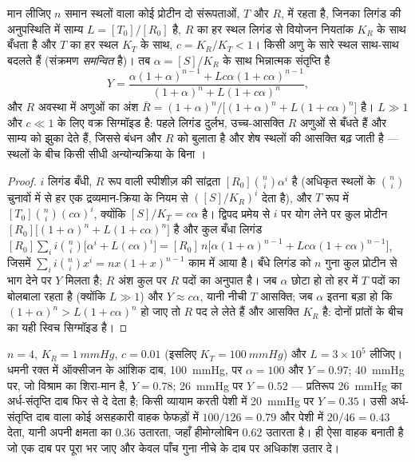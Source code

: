 \begin{theorem}[मोनो--वाइमन--शांज़ प्रतिरूप]\label{thm:b3:structural-biology:mwc}
मान लीजिए $n$ समान स्थलों वाला कोई प्रोटीन दो संरूपताओं,
$T$ और $R$, में रहता है, जिनका लिगंड की अनुपस्थिति में साम्य
$L = [T_{0}]/[R_{0}]$ है, $R$ का हर स्थल लिगंड से वियोजन नियतांक
$K_{R}$ के साथ बँधता है और $T$ का हर स्थल $K_{T}$ के साथ,
$c = K_{R}/K_{T} < 1$। किसी अणु के सारे स्थल साथ-साथ बदलते हैं
(संक्रमण \emph{समन्वित} है)। तब $\alpha = [S]/K_{R}$ के साथ
भिन्नात्मक संतृप्ति है
\[
Y = \frac{\alpha(1+\alpha)^{n-1} + Lc\alpha(1+c\alpha)^{n-1}}
{(1+\alpha)^{n} + L(1+c\alpha)^{n}},
\]
और $R$ अवस्था में अणुओं का अंश $\bar R =
(1+\alpha)^{n}/\bigl[(1+\alpha)^{n} + L(1+c\alpha)^{n}\bigr]$ है। $L
\gg 1$ और $c \ll 1$ के लिए वक्र सिग्मॉइड है: पहले लिगंड दुर्लभ,
उच्च-आसक्ति $R$ अणुओं से बँधते हैं और साम्य को झुका देते हैं, जिससे
बंधन और $R$ को बुलाता है और शेष स्थलों की आसक्ति बढ़ जाती है --- स्थलों
के बीच किसी सीधी अन्योन्यक्रिया के बिना ।
\end{theorem}
\begin{proof}
$i$ लिगंड बँधी, $R$ रूप वाली स्पीशीज़ की सांद्रता
$[R_{0}]\binom{n}{i}\alpha^{i}$ है (अधिकृत स्थलों के $\binom{n}{i}$
चुनावों में से हर एक द्रव्यमान-क्रिया के नियम से $([S]/K_{R})^{i}$
देता है), और $T$ रूप में $[T_{0}]\binom{n}{i}(c\alpha)^{i}$, क्योंकि
$[S]/K_{T} = c\alpha$ है। द्विपद प्रमेय से $i$ पर योग लेने पर कुल
प्रोटीन $[R_{0}]\bigl[(1+\alpha)^{n} + L(1+c\alpha)^{n}\bigr]$ है
और कुल बँधा लिगंड $[R_{0}]\sum_{i} i\binom{n}{i}\bigl[
\alpha^{i} + L(c\alpha)^{i}\bigr] = [R_{0}]\,n\bigl[\alpha(1+\alpha)^{n-1}
+ Lc\alpha(1+c\alpha)^{n-1}\bigr]$, जिसमें $\sum_{i} i\binom{n}{i}x^{i} =
nx(1+x)^{n-1}$ काम में आया है। बँधे लिगंड को $n$ गुना कुल प्रोटीन से
भाग देने पर $Y$ मिलता है; $R$ अंश कुल पर $R$ पदों का अनुपात है। जब
$\alpha$ छोटा हो तो हर में $T$ पदों का बोलबाला रहता है (क्योंकि $L \gg 1$)
और $Y \approx c\alpha$, यानी नीची $T$ आसक्ति; जब $\alpha$ इतना बड़ा
हो कि $(1+\alpha)^{n} > L(1+c\alpha)^{n}$ हो जाए तो $R$ पद ले लेते हैं
और आसक्ति $K_{R}$ है: दोनों प्रांतों के बीच का यही स्विच सिग्मॉइड है।
\end{proof}

\begin{example}[संख्याओं में हीमोग्लोबिन]\label{ex:b3:structural-biology:hb-numbers}
$n = 4$, $K_{R} = \qty{1}{mmHg}$, $c = 0.01$ (इसलिए $K_{T} =
\qty{100}{mmHg}$) और $L = 3\times 10^{5}$ लीजिए। धमनी रक्त में
ऑक्सीजन के आंशिक दाब, \qty{100}{mmHg}, पर $\alpha = 100$ और $Y =
0.97$; \qty{40}{mmHg} पर, जो विश्राम का शिरा-मान है, $Y = 0.78$;
\qty{26}{mmHg} पर $Y = 0.52$ --- प्रतिरूप \qty{26}{mmHg} का
अर्ध-संतृप्ति दाब फिर से दे देता है; किसी व्यायाम करती पेशी में
\qty{20}{mmHg} पर $Y = 0.35$। उसी अर्ध-संतृप्ति दाब वाला कोई असहकारी
वाहक फेफड़ों में $100/126 = 0.79$ और पेशी में
$20/46 = 0.43$ देता, यानी अपनी क्षमता का $0.36$ उतारता, जहाँ
हीमोग्लोबिन $0.62$ उतारता है।  ही ऐसा वाहक बनाती है जो एक दाब
पर पूरा भर जाए और केवल पाँच गुना नीचे के दाब पर अधिकांश उतार दे।
\end{example}

